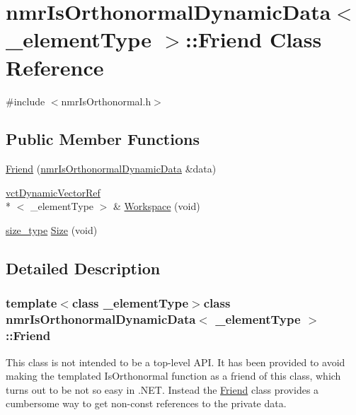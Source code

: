 \hypertarget{classnmr_is_orthonormal_dynamic_data_1_1_friend}{\section{nmr\-Is\-Orthonormal\-Dynamic\-Data$<$ \-\_\-element\-Type $>$\-:\-:Friend Class Reference}
\label{classnmr_is_orthonormal_dynamic_data_1_1_friend}
}


{\ttfamily \#include $<$nmr\-Is\-Orthonormal.\-h$>$}

\subsection*{Public Member Functions}
\begin{DoxyCompactItemize}
\item 
\hyperlink{classnmr_is_orthonormal_dynamic_data_1_1_friend_ae637d50371e5b192dcbebde961803deb}{Friend} (\hyperlink{classnmr_is_orthonormal_dynamic_data}{nmr\-Is\-Orthonormal\-Dynamic\-Data} \&data)
\item 
\hyperlink{classvct_dynamic_vector_ref}{vct\-Dynamic\-Vector\-Ref}\\*
$<$ \-\_\-element\-Type $>$ \& \hyperlink{classnmr_is_orthonormal_dynamic_data_1_1_friend_aa75a9b79bf63019e7616558b2fca2b9b}{Workspace} (void)
\item 
\hyperlink{classnmr_is_orthonormal_dynamic_data_ae69581f9b270b49b1cd1d16ff29a5409}{size\-\_\-type} \hyperlink{classnmr_is_orthonormal_dynamic_data_1_1_friend_a7f10ac301fb4b5ffa966e760fa37c892}{Size} (void)
\end{DoxyCompactItemize}


\subsection{Detailed Description}
\subsubsection*{template$<$class \-\_\-element\-Type$>$class nmr\-Is\-Orthonormal\-Dynamic\-Data$<$ \-\_\-element\-Type $>$\-::\-Friend}

This class is not intended to be a top-\/level A\-P\-I. It has been provided to avoid making the templated Is\-Orthonormal function as a friend of this class, which turns out to be not so easy in .N\-E\-T. Instead the \hyperlink{classnmr_is_orthonormal_dynamic_data_1_1_friend}{Friend} class provides a cumbersome way to get non-\/const references to the private data. 

